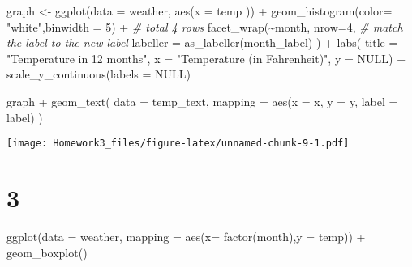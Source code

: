 \documentclass[
]{article}
\newenvironment{Shaded}{\begin{snugshade}}{\end{snugshade}}
\newcommand{\AttributeTok}[1]{\textcolor[rgb]{0.77,0.63,0.00}{#1}}
\newcommand{\CommentTok}[1]{\textcolor[rgb]{0.56,0.35,0.01}{\textit{#1}}}
\newcommand{\ConstantTok}[1]{\textcolor[rgb]{0.00,0.00,0.00}{#1}}
\newcommand{\DecValTok}[1]{\textcolor[rgb]{0.00,0.00,0.81}{#1}}
\newcommand{\FunctionTok}[1]{\textcolor[rgb]{0.00,0.00,0.00}{#1}}
\newcommand{\NormalTok}[1]{#1}
\newcommand{\OtherTok}[1]{\textcolor[rgb]{0.56,0.35,0.01}{#1}}
\newcommand{\SpecialCharTok}[1]{\textcolor[rgb]{0.00,0.00,0.00}{#1}}
\newcommand{\StringTok}[1]{\textcolor[rgb]{0.31,0.60,0.02}{#1}}
\begin{document}
\begin{Shaded}
\begin{Highlighting}[]
\NormalTok{graph }\OtherTok{\textless{}{-}} \FunctionTok{ggplot}\NormalTok{(}\AttributeTok{data =}\NormalTok{ weather, }\FunctionTok{aes}\NormalTok{(}\AttributeTok{x =}\NormalTok{ temp )) }\SpecialCharTok{+}
  \FunctionTok{geom\_histogram}\NormalTok{(}\AttributeTok{color=} \StringTok{"white"}\NormalTok{,}\AttributeTok{binwidth =} \DecValTok{5}\NormalTok{) }\SpecialCharTok{+}
  \CommentTok{\# total 4 rows}
  \FunctionTok{facet\_wrap}\NormalTok{(}\SpecialCharTok{\textasciitilde{}}\NormalTok{month,}
             \AttributeTok{nrow=}\DecValTok{4}\NormalTok{,}
             \CommentTok{\# match the label to the new label}
             \AttributeTok{labeller =} \FunctionTok{as\_labeller}\NormalTok{(month\_label)}
\NormalTok{             ) }\SpecialCharTok{+} 
  \FunctionTok{labs}\NormalTok{(}
      \AttributeTok{title =} \StringTok{"Temperature in 12 months"}\NormalTok{,}
      \AttributeTok{x =} \StringTok{"Temperature (in Fahrenheit)"}\NormalTok{,}
      \AttributeTok{y =} \ConstantTok{NULL}\NormalTok{) }\SpecialCharTok{+} 
      \FunctionTok{scale\_y\_continuous}\NormalTok{(}\AttributeTok{labels =} \ConstantTok{NULL}\NormalTok{) }

\NormalTok{graph }\SpecialCharTok{+}
     \FunctionTok{geom\_text}\NormalTok{(}
       \AttributeTok{data =}\NormalTok{ temp\_text,}
       \AttributeTok{mapping =} \FunctionTok{aes}\NormalTok{(}\AttributeTok{x =}\NormalTok{ x, }\AttributeTok{y =}\NormalTok{ y,}
                     \AttributeTok{label =}\NormalTok{ label)}
\NormalTok{     )}
\end{Highlighting}
\end{Shaded}

\texttt{[image: Homework3\_files/figure-latex/unnamed-chunk-9-1.pdf]}

\hypertarget{section-1}{%
\section{3}\label{section-1}}

\begin{Shaded}
\begin{Highlighting}[]
\FunctionTok{ggplot}\NormalTok{(}\AttributeTok{data =}\NormalTok{ weather, }\AttributeTok{mapping =} \FunctionTok{aes}\NormalTok{(}\AttributeTok{x=} \FunctionTok{factor}\NormalTok{(month),}\AttributeTok{y =}\NormalTok{ temp)) }\SpecialCharTok{+}
  \FunctionTok{geom\_boxplot}\NormalTok{()}
\end{Highlighting}
\end{Shaded}
\end{document}
